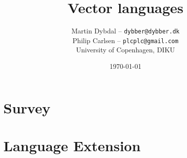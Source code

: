\documentclass[10pt,a4paper,final,oneside,openany]{memoir}
\title{Vector languages }
\author{
  Martin Dybdal -- \texttt{dybber@dybber.dk} \\
  Philip Carlsen -- \texttt{plcplc@gmail.com}
\\
University of Copenhagen, DIKU}
\date{\today}
\begin{document}


\newpage
\renewcommand*{\cftpartname}{Part\space}
\tableofcontents*





\part{Survey}


\part{Language Extension}



\clearpage
{}
\printbibliography
\end{document}
